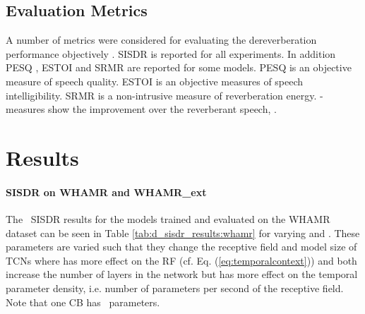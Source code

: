 \documentclass[conference,a4paper]{IEEEtran}
\begin{document}
\subsection{Evaluation Metrics}
A number of metrics were considered for evaluating the dereverberation performance objectively {\cite{Goetze2}}. \ac{SISDR} is reported for all experiments. In addition \ac{PESQ} \cite{PESQ},
\ac{ESTOI} \cite{estoi} and \ac{SRMR} \cite{srmr} are reported for some models. \ac{PESQ} is an objective measure of speech quality. \ac{ESTOI} is an objective measures of speech intelligibility. \ac{SRMR} is a non-intrusive measure of reverberation energy. -measures show the improvement over the reverberant speech, .
\section{Results}\label{sec:5}

\paragraph{  \ac{SISDR} on WHAMR and WHAMR\_ext}
The ~SISDR results for the models trained and evaluated on the WHAMR dataset can be seen in Table \ref{tab:d_sisdr_results:whamr} {for varying  and }. These parameters are varied such that they change the receptive field and model size of \acp{TCN} where  has more effect on the \ac{RF} (cf. Eq. (\ref{eq:temporalcontext})) and both increase the number of layers in the network but  has more effect on the temporal parameter density, i.e. number of parameters per second of the receptive field. Note that one \ac{CB} has ~parameters. 
\end{document}
